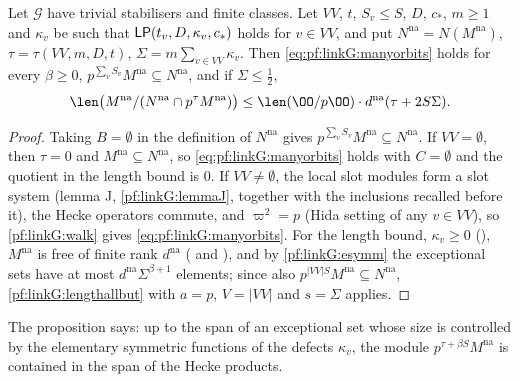\begin{proposition}\label{pf:linkG:manyorbits}
Let $\mathcal G$ have trivial stabilisers and finite classes. Let $VV$, $t$, $S_v\le S$, $D$, $c_*$, $m\ge1$ and $\kappa_v$ be
such that $\mathsf{LP}(t_v,D,\kappa_v,c_*)$ holds for $v\in VV$, and put $N^{\mathrm{na}}=N(M^{\mathrm{na}})$,
$\tau=\tau(VV,m,D,t)$, $\Sigma=m\sum_{v\in VV}\kappa_v$. Then \eqref{eq:pf:linkG:manyorbits} holds for every $\beta\ge0$,
$p^{\sum_vS_v}M^{\mathrm{na}}\subseteq N^{\mathrm{na}}$, and if $\Sigma\le\frac12$,
\[
\len\bigl(M^{\mathrm{na}}/(N^{\mathrm{na}}\cap p^{\tau}M^{\mathrm{na}})\bigr)\le\len(\OO/p\OO)\cdot d^{\mathrm{na}}(\tau+2S\Sigma).
\]
\end{proposition}

\begin{proof}
Taking $B=\emptyset$ in the definition of $N^{\mathrm{na}}$ gives $p^{\sum_vS_v}M^{\mathrm{na}}\subseteq N^{\mathrm{na}}$. If
$VV=\emptyset$, then $\tau=0$ and $M^{\mathrm{na}}\subseteq N^{\mathrm{na}}$, so \eqref{eq:pf:linkG:manyorbits} holds with $C=\emptyset$
and the quotient in the length bound is $0$. If $VV\ne\emptyset$, the local slot modules form a slot system (lemma J,
\cref{pf:linkG:lemmaJ}, together with the inclusions recalled before it), the Hecke operators commute,
and $\varpi^2=p$ (Hida setting of any $v\in VV$), so \cref{pf:linkG:walk} gives \eqref{eq:pf:linkG:manyorbits}. For the length bound,
$\kappa_v\ge0$ (), $M^{\mathrm{na}}$ is free of finite rank
$d^{\mathrm{na}}$ ( and ),
and by \cref{pf:linkG:esymm} the exceptional sets have at most $d^{\mathrm{na}}\Sigma^{\beta+1}$ elements; since also
$p^{|VV|S}M^{\mathrm{na}}\subseteq N^{\mathrm{na}}$, \cref{pf:linkG:lengthallbut} with $a=p$, $V=|VV|$ and $s=\Sigma$ applies.
\end{proof}

The proposition says: up to the span of an exceptional set whose size is controlled by the elementary symmetric functions
of the defects $\kappa_v$, the module $p^{\tau+\beta S}M^{\mathrm{na}}$ is contained in the span of the Hecke products.

